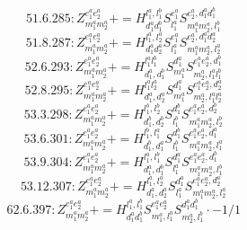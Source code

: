 \documentclass[letterpaper,10pt,fleqn,leqno,onecolumn]{article}
\begin{document}
\begin{equation} \;\;\;\;\;\;  51.6.285: Z^{e_{1}^{a}e_{2}^{a}}_{m_{1}^{a}m_{2}^{a}}+=H^{l_{1}^{a},l_{1}^{b}}_{d_{1}^{a}d_{1}^{b}}S^{e_{1}^{a}}_{l_{1}^{a}}S^{e_{2}^{a},d_{1}^{a}d_{1}^{b}}_{m_{1}^{a}m_{2}^{a},l_{1}^{b}} \end{equation}
\begin{equation} \;\;\;\;\;\;  51.8.287: Z^{e_{1}^{a}e_{2}^{a}}_{m_{1}^{a}m_{2}^{a}}+=H^{l_{1}^{a},l_{2}^{a}}_{d_{1}^{a}d_{2}^{a}}S^{e_{1}^{a}}_{l_{1}^{a}}S^{e_{2}^{a},d_{1}^{a}d_{2}^{a}}_{m_{1}^{a}m_{2}^{a},l_{2}^{a}} \end{equation}
\begin{equation} \;\;\;\;\;\;  52.6.293: Z^{e_{1}^{a}e_{2}^{a}}_{m_{1}^{a}m_{2}^{a}}+=H^{l_{1}^{a}l_{1}^{b}}_{d_{1}^{a},d_{1}^{b}}S^{d_{1}^{a}}_{m_{1}^{a}}S^{e_{1}^{a}e_{2}^{a},d_{1}^{b}}_{m_{2}^{a},l_{1}^{a}l_{1}^{b}} \end{equation}
\begin{equation} \;\;\;\;\;\;  52.8.295: Z^{e_{1}^{a}e_{2}^{a}}_{m_{1}^{a}m_{2}^{a}}+=H^{l_{1}^{a}l_{2}^{a}}_{d_{1}^{a},d_{2}^{a}}S^{d_{1}^{a}}_{m_{1}^{a}}S^{e_{1}^{a}e_{2}^{a},d_{2}^{a}}_{m_{2}^{a},l_{1}^{a}l_{2}^{a}} \end{equation}
\begin{equation} \;\;\;\;\;\;  53.3.298: Z^{e_{1}^{a}e_{2}^{a}}_{m_{1}^{a}m_{2}^{a}}+=H^{l_{1}^{b},l_{2}^{b}}_{d_{1}^{b},d_{2}^{b}}S^{d_{1}^{b}}_{l_{1}^{b}}S^{e_{1}^{a}e_{2}^{a},d_{2}^{b}}_{m_{1}^{a}m_{2}^{a},l_{2}^{b}} \end{equation}
\begin{equation} \;\;\;\;\;\;  53.6.301: Z^{e_{1}^{a}e_{2}^{a}}_{m_{1}^{a}m_{2}^{a}}+=H^{l_{1}^{b},l_{1}^{a}}_{d_{1}^{b},d_{1}^{a}}S^{d_{1}^{b}}_{l_{1}^{b}}S^{e_{1}^{a}e_{2}^{a},d_{1}^{a}}_{m_{1}^{a}m_{2}^{a},l_{1}^{a}} \end{equation}
\begin{equation} \;\;\;\;\;\;  53.9.304: Z^{e_{1}^{a}e_{2}^{a}}_{m_{1}^{a}m_{2}^{a}}+=H^{l_{1}^{a},l_{1}^{b}}_{d_{1}^{a},d_{1}^{b}}S^{d_{1}^{a}}_{l_{1}^{a}}S^{e_{1}^{a}e_{2}^{a},d_{1}^{b}}_{m_{1}^{a}m_{2}^{a},l_{1}^{b}} \end{equation}
\begin{equation} \;\;\;\;\;\;  53.12.307: Z^{e_{1}^{a}e_{2}^{a}}_{m_{1}^{a}m_{2}^{a}}+=H^{l_{1}^{a},l_{2}^{a}}_{d_{1}^{a},d_{2}^{a}}S^{d_{1}^{a}}_{l_{1}^{a}}S^{e_{1}^{a}e_{2}^{a},d_{2}^{a}}_{m_{1}^{a}m_{2}^{a},l_{2}^{a}} \end{equation}
\begin{equation} \;\;\;\;\;\;  62.6.397: Z^{e_{1}^{a}e_{2}^{a}}_{m_{1}^{a}m_{2}^{a}}+=H^{l_{1}^{a},l_{1}^{b}}_{d_{1}^{a}d_{1}^{b}}S^{e_{1}^{a}e_{2}^{a}}_{m_{1}^{a},l_{1}^{a}}S^{d_{1}^{a}d_{1}^{b}}_{m_{2}^{a},l_{1}^{b}}\cdot -1/1 \end{equation}
\end{document}
